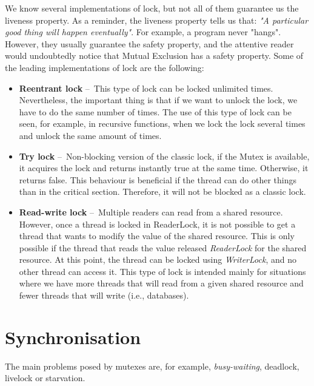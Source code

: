 We know several implementations of lock, but not all of them guarantee us the liveness property.
As a reminder, the liveness property tells us that: \emph{"A particular good thing will happen eventually"}.
For example, a program never "hangs".
However, they usually guarantee the safety property, and the attentive reader would undoubtedly notice that Mutual Exclusion has a safety property.
Some of the leading implementations of lock are the following:
\begin {itemize}
    \item \textbf{Reentrant lock} \---\ This type of lock can be locked unlimited times.
    Nevertheless, the important thing is that if we want to unlock the lock, we have to do the same number of times.
    The use of this type of lock can be seen, for example, in recursive functions, when we lock the lock several times and unlock the same amount of times.
    \item \textbf{Try lock} \---\ Non-blocking version of the classic lock, if the Mutex is available, it acquires the lock and returns instantly true at the same time.
    Otherwise, it returns false.
    This behaviour is beneficial if the thread can do other things than in the critical section.
    Therefore, it will not be blocked as a classic lock.
    \item \textbf{Read-write lock} \---\ Multiple readers can read from a shared resource.
    However, once a thread is locked in ReaderLock, it is not possible to get a thread that wants to modify the value of the shared resource.
    This is only possible if the thread that reads the value released \emph{ReaderLock} for the shared resource.
    At this point, the thread can be locked using \emph{WriterLock}, and no other thread can access it.
    This type of lock is intended mainly for situations where we have more threads that will read from a given shared resource and fewer threads that will write (i.e., databases).
\end{itemize}

\section{Synchronisation}
\label{04:synchronization}

The main problems posed by mutexes are, for example, \emph {busy-waiting}, deadlock, livelock or starvation.

